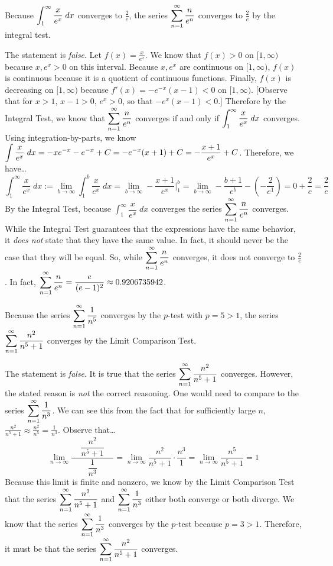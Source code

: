\documentclass[11pt,letterpaper]{article}
\begin{document}
 Because $\displaystyle\int_1^\infty \dfrac{x}{e^x} \;dx$ converges to $\frac{2}{e}$, the series $\displaystyle\sum_{n=1}^\infty \frac{n}{e^n}$ converges to $\frac{2}{e}$ by the integral test. \pspace

\sol The statement is \textit{false}. Let $f(x)= \frac{x}{e^x}$. We know that $f(x) > 0$ on $[1, \infty)$ because $x, e^x > 0$ on this interval. Because $x, e^x$ are continuous on $[1, \infty)$, $f(x)$ is continuous because it is a quotient of continuous functions. Finally, $f(x)$ is decreasing on $[1, \infty)$ because $f'(x)= -e^{-x} (x - 1) < 0$ on $[1, \infty)$. [Observe that for $x > 1$, $x - 1 > 0$, $e^x > 0$, so that $-e^x (x - 1) < 0$.] Therefore by the Integral Test, we know that $\displaystyle\sum_{n=1}^\infty \frac{n}{e^n}$ converges if and only if $\displaystyle\int_1^\infty \dfrac{x}{e^x} \;dx$ converges. Using integration-by-parts, we know $\displaystyle\int \frac{x}{e^x} \;dx=  -xe^{-x} - e^{-x} + C= -e^{-x} (x + 1) + C= -\frac{x + 1}{e^x} + C$. Therefore, we have\dots
	\[
	\int_1^\infty \dfrac{x}{e^x} \;dx:= \lim_{b \to \infty} \int_1^b \dfrac{x}{e^x} \;dx= \lim_{b \to \infty} -\frac{x + 1}{e^x} \bigg|_1^b= \lim_{b \to \infty} -\dfrac{b + 1}{e^b} - \left( -\dfrac{2}{e^1} \right)= 0 + \dfrac{2}{e}= \dfrac{2}{e}
	\]
By the Integral Test, because $\int_1^\infty \dfrac{x}{e^x} \;dx$ converges the series $\displaystyle\sum_{n=1}^\infty \frac{n}{e^n}$ converges. While the Integral Test guarantees that the expressions have the same behavior, it \textit{does not} state that they have the same value. In fact, it should never be the case that they will be equal. So, while $\displaystyle\sum_{n=1}^\infty \frac{n}{e^n}$ converges, it does not converge to $\frac{2}{e}$. In fact, $\displaystyle\sum_{n=1}^\infty \frac{n}{e^n}= \frac{e}{(e - 1)^2} \approx 0.9206735942$. \pvspace{1.3cm}



 Because the series $\displaystyle\sum_{n=1}^\infty \dfrac{1}{n^5}$ converges by the $p$-test with $p= 5 > 1$, the series $\displaystyle\sum_{n=1}^\infty \dfrac{n^2}{n^5 + 1}$ converges by the Limit Comparison Test. \pspace

\sol The statement is \textit{false}. It is true that the series $\displaystyle\sum_{n=1}^\infty \dfrac{n^2}{n^5 + 1}$ converges. However, the stated reason is \textit{not} the correct reasoning. One would need to compare to the series $\displaystyle\sum_{n=1}^\infty \frac{1}{n^3}$. We can see this from the fact that for sufficiently large $n$, $\frac{n^2}{n^5 + 1} \approx \frac{n^2}{n^5}= \frac{1}{n^3}$. Observe that\dots
	\[
	\lim_{n \to \infty} \dfrac{\;\;\;\;\dfrac{n^2}{n^5 + 1}\;\;\;\;}{\dfrac{1}{n^3}}= \lim_{n \to \infty} \dfrac{n^2}{n^5 + 1} \cdot \dfrac{n^3}{1}= \lim_{n \to \infty} \dfrac{n^5}{n^5 + 1}= 1
	\]
Because this limit is finite and nonzero, we know by the Limit Comparison Test that the series $\displaystyle\sum_{n=1}^\infty \dfrac{n^2}{n^5 + 1}$ and $\displaystyle\sum_{n=1}^\infty \dfrac{1}{n^3}$ either both converge or both diverge. We know that the series $\displaystyle\sum_{n=1}^\infty \dfrac{1}{n^3}$ converges by the $p$-test because $p= 3 > 1$. Therefore, it must be that the series $\displaystyle\sum_{n=1}^\infty \dfrac{n^2}{n^5 + 1}$ converges. \pvspace{1.3cm}
\end{document}
